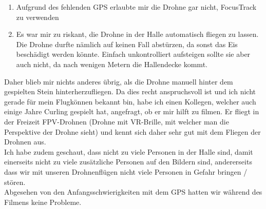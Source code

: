 \documentclass[11pt]{article}
\begin{document}
    \begin{enumerate}
        \item Aufgrund des fehlenden GPS erlaubte mir die Drohne gar nicht, FocusTrack zu verwenden
        \item Es war mir zu riskant, die Drohne in der Halle automatisch fliegen zu lassen. Die Drohne durfte nämlich auf keinen Fall abstürzen,
        da sonst das Eis beschädigt werden könnte. Einfach unkontrolliert aufsteigen sollte sie aber auch nicht, da nach wenigen Metern
        die Hallendecke kommt.
    \end{enumerate}
    Daher blieb mir nichts anderes übrig, als die Drohne manuell hinter dem gespielten Stein hinterherzufliegen. Da dies recht anspruchsvoll ist
    und ich nicht gerade für mein Flugkönnen bekannt bin, habe ich einen Kollegen, welcher auch einige Jahre Curling gespielt hat, angefragt, ob er
    mir hilft zu filmen. Er fliegt in der Freizeit FPV-Drohnen (Drohne mit VR-Brille, mit welcher man die Perspektive der Drohne sieht) und kennt
    sich daher sehr gut mit dem Fliegen der Drohnen aus.\\
    Ich habe zudem geschaut, dass nicht zu viele Personen in der Halle sind, damit einerseits nicht zu viele zusätzliche Personen auf den Bildern
    sind, andererseits dass wir mit unseren Drohnenflügen nicht viele Personen in Gefahr bringen / stören.\\
    Abgesehen von den Anfangsschwierigkeiten mit dem GPS hatten wir während des Filmens keine Probleme.

\end{document}
